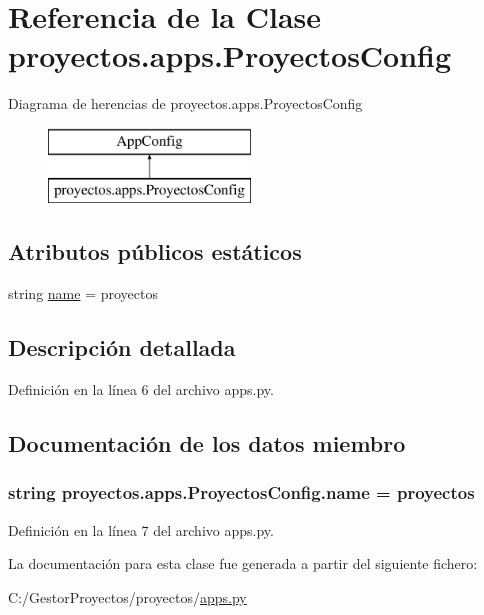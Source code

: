 \hypertarget{classproyectos_1_1apps_1_1_proyectos_config}{}\section{Referencia de la Clase proyectos.\+apps.\+Proyectos\+Config}
\label{classproyectos_1_1apps_1_1_proyectos_config}
Diagrama de herencias de proyectos.\+apps.\+Proyectos\+Config\begin{figure}[H]
\begin{center}
\leavevmode
\includegraphics[height=2.000000cm]{classproyectos_1_1apps_1_1_proyectos_config}
\end{center}
\end{figure}
\subsection*{Atributos públicos estáticos}
\begin{DoxyCompactItemize}
\item 
string \hyperlink{classproyectos_1_1apps_1_1_proyectos_config_a197b58a8405c45caa54a44901d15dbed}{name} = \textquotesingle{}proyectos\textquotesingle{}
\end{DoxyCompactItemize}


\subsection{Descripción detallada}


Definición en la línea 6 del archivo apps.\+py.



\subsection{Documentación de los datos miembro}
\subsubsection[{\texorpdfstring{name}{name}}]{\setlength{\rightskip}{0pt plus 5cm}string proyectos.\+apps.\+Proyectos\+Config.\+name = \textquotesingle{}proyectos\textquotesingle{}\hspace{0.3cm}{\ttfamily [static]}}\hypertarget{classproyectos_1_1apps_1_1_proyectos_config_a197b58a8405c45caa54a44901d15dbed}{}\label{classproyectos_1_1apps_1_1_proyectos_config_a197b58a8405c45caa54a44901d15dbed}


Definición en la línea 7 del archivo apps.\+py.



La documentación para esta clase fue generada a partir del siguiente fichero\+:\begin{DoxyCompactItemize}
\item 
C\+:/\+Gestor\+Proyectos/proyectos/\hyperlink{proyectos_2apps_8py}{apps.\+py}\end{DoxyCompactItemize}
